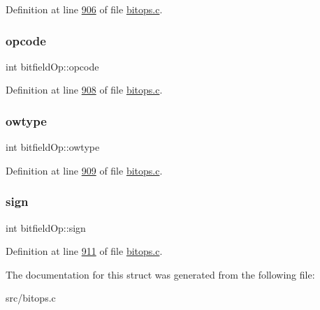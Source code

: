 Definition at line \hyperlink{bitops_8c_source_l00906}{906} of file \hyperlink{bitops_8c_source}{bitops.\+c}.

\mbox{\label{structbitfieldOp_a6590f0d17ae13623625a80cc2784b253}} 
\subsubsection{\texorpdfstring{opcode}{opcode}}
{\footnotesize\ttfamily int bitfield\+Op\+::opcode}



Definition at line \hyperlink{bitops_8c_source_l00908}{908} of file \hyperlink{bitops_8c_source}{bitops.\+c}.

\mbox{\label{structbitfieldOp_a4a18ab35d1e0fe98ad934c4e2bb7cb06}} 
\subsubsection{\texorpdfstring{owtype}{owtype}}
{\footnotesize\ttfamily int bitfield\+Op\+::owtype}



Definition at line \hyperlink{bitops_8c_source_l00909}{909} of file \hyperlink{bitops_8c_source}{bitops.\+c}.

\mbox{\label{structbitfieldOp_a469bb961742ba367638b773b4910e1d3}} 
\subsubsection{\texorpdfstring{sign}{sign}}
{\footnotesize\ttfamily int bitfield\+Op\+::sign}



Definition at line \hyperlink{bitops_8c_source_l00911}{911} of file \hyperlink{bitops_8c_source}{bitops.\+c}.



The documentation for this struct was generated from the following file\+:\begin{DoxyCompactItemize}
\item 
src/bitops.\+c\end{DoxyCompactItemize}

